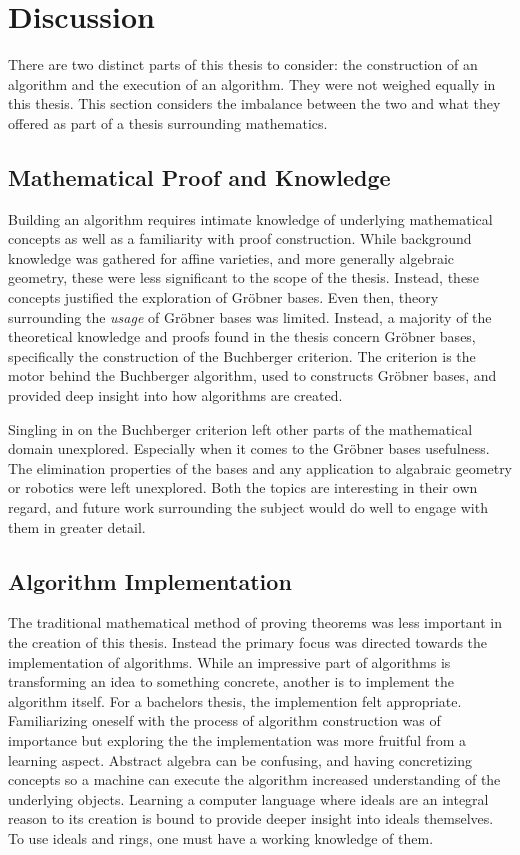 \clearpage{\thispagestyle{empty}\cleardoublepage}

\section{Discussion}
There are two distinct parts of this thesis to consider: the construction of an algorithm and the execution of an algorithm. They were not weighed equally in this thesis. This section considers the imbalance between the two and what they offered as part of a thesis surrounding mathematics.

\subsection{Mathematical Proof and Knowledge}
Building an algorithm requires intimate knowledge of underlying mathematical concepts as well as a familiarity with proof construction. While background knowledge was gathered for affine varieties, and more generally algebraic geometry, these were less significant to the scope of the thesis. Instead, these concepts justified the exploration of Gröbner bases. Even then, theory surrounding the \textit{usage} of Gröbner bases was limited. Instead, a majority of the theoretical knowledge and proofs found in the thesis concern Gröbner bases, specifically the construction of the Buchberger criterion. The criterion is the motor behind the Buchberger algorithm, used to constructs Gröbner bases, and provided deep insight into how algorithms are created.

Singling in on the Buchberger criterion left other parts of the mathematical domain unexplored. Especially when it comes to the Gröbner bases usefulness. The  elimination properties of the bases and any application to algabraic geometry or robotics were left unexplored. Both the topics are interesting in their own regard, and future work surrounding the subject would do well to engage with them in greater detail. 

\subsection{Algorithm Implementation} 
The traditional mathematical method of proving theorems was less important in the creation of this thesis. Instead the primary focus was directed towards the implementation of algorithms. While an impressive part of algorithms is transforming an idea to something concrete, another is to implement the algorithm itself. For a bachelors thesis, the implemention felt appropriate. Familiarizing oneself with the process of algorithm construction was of importance but exploring the the implementation was more fruitful from a learning aspect. Abstract algebra can be confusing, and having concretizing concepts so a machine can execute the algorithm increased understanding of the underlying objects. Learning a computer language where ideals are an integral reason to its creation is bound to provide deeper insight into ideals themselves. To use ideals and rings, one must have a working knowledge of them.

